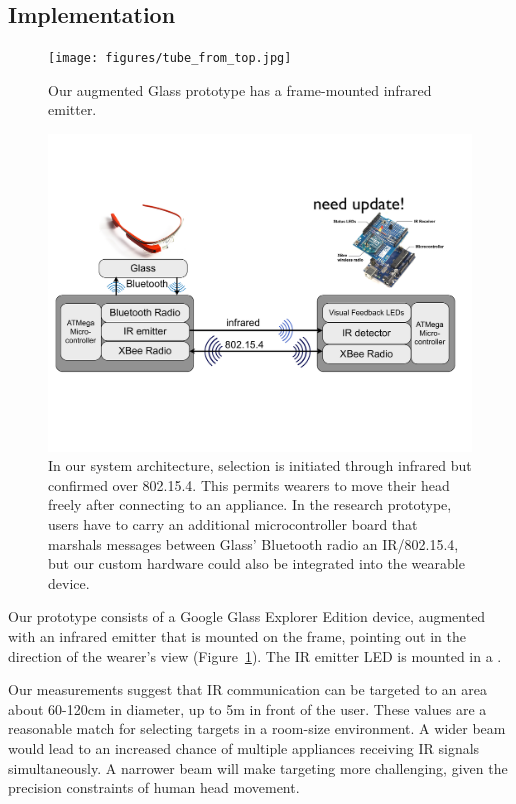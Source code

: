 \subsection{Implementation}
\begin{figure}[t]
\centering
\texttt{[image: figures/tube\_from\_top.jpg]}
\caption{Our augmented Glass prototype has a frame-mounted infrared emitter.}
\label{fig:glass}
\end{figure}
\begin{figure}[t]
\centering
\includegraphics[width=1.0\columnwidth]{figures/architecture}
\caption{In our system architecture, selection is initiated through infrared but confirmed over 802.15.4. This permits wearers to move their head freely after connecting to an appliance. In the research prototype, users have to carry an additional microcontroller board that marshals messages between Glass' Bluetooth radio an IR/802.15.4, but our custom hardware could also be integrated into the wearable device.}
\label{fig:architecture}
\end{figure}

Our prototype consists of a Google Glass Explorer Edition device, augmented with an infrared emitter that is mounted on the frame, pointing out in the direction of the wearer's view (Figure~\ref{fig:glass}). The IR emitter LED is mounted in a .

Our measurements suggest that IR communication can be targeted to an area about 60-120cm in diameter, up to 5m in front of the user. These values are a reasonable match for selecting targets in a room-size environment. A wider beam would lead to an increased chance of multiple appliances receiving IR signals simultaneously. A narrower beam will make targeting more challenging, given the precision constraints of human head movement.

